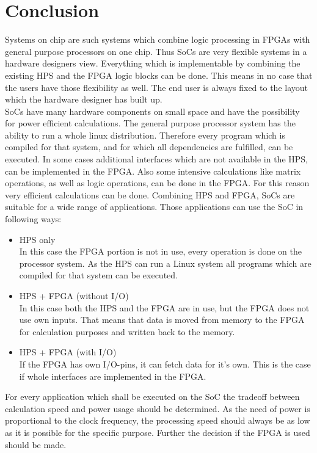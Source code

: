 \chapter{Conclusion}
  \label{kap:ausblick}
  Systems on chip are such systems which combine logic processing in FPGAs with general purpose processors on one chip. Thus SoCs are very flexible systems in a hardware designers view. Everything which is implementable by combining the existing HPS and the FPGA logic blocks can be done. This means in no case that the users have those flexibility as well. The end user is always fixed to the layout which the hardware designer has built up.\\
  SoCs have many hardware components on small space and have the possibility for power efficient calculations. The general purpose processor system has the ability to run a whole linux distribution. Therefore every program which is compiled for that system, and for which all dependencies are fulfilled, can be executed. In some cases additional interfaces which are not available in the HPS, can be implemented in the FPGA. Also some intensive calculations like matrix operations, as well as logic operations, can be done in the FPGA. For this reason very efficient calculations can be done. Combining HPS and FPGA, SoCs are suitable for a wide range of applications. Those applications can use the SoC in following ways:
 \begin{itemize}
 \item HPS only\\
 In this case the FPGA portion is not in use, every operation is done on the processor system. As the HPS can run a Linux system all programs which are compiled for that system can be executed. 
 \item HPS + FPGA (without I/O)\\
 In this case both the HPS and the FPGA are in use, but the FPGA does not use own inputs. That means that data is moved from memory to the FPGA for calculation purposes and written back to the memory. 
 \item HPS + FPGA (with I/O)\\
 If the FPGA has own I/O-pins, it can fetch data for it's own. This is the case if whole interfaces are implemented in the FPGA. 
 \end{itemize}
 For every application which shall be executed on the SoC the tradeoff between calculation speed and power usage should be determined. As the need of power is proportional to the clock frequency, the processing speed should always be as low as it is possible for the specific purpose. Further the decision if the FPGA is used should be made.\\
